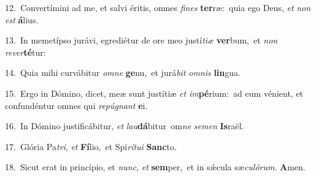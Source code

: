 {\numbfont\textcolor{\numbcolor}{12.}}~Convertímini ad me, et salvi éritis, omnes \textit{fi}\-\textit{nes} \textbf{ter}\-ræ:~\star quia ego Deus, \textit{et} \textit{non} \textit{est} \textbf{á}\-lius.\par
{\numbfont\textcolor{\numbcolor}{13.}}~In memetípso jurávi, egrediétur de ore meo justí\-\textit{ti}\-\textit{æ} \textbf{ver}\-bum,~\star et \textit{non} \textit{re}\-\textit{ver}\textbf{té}tur:\par
{\numbfont\textcolor{\numbcolor}{14.}}~Quia mihi curvábitur \textit{om}\-\textit{ne} \textbf{ge}\-nu,~\star et jurá\textit{bit} \textit{om}\-\textit{nis} \textbf{lin}\-gua.\par
{\numbfont\textcolor{\numbcolor}{15.}}~Ergo in Dómino, dicet, meæ sunt justítiæ \textit{et} \textit{im}\-\textbf{pé}rium:~\star ad eum vénient, et confundéntur omnes qui \textit{re}\-\textit{pú}\textit{gnant} \textbf{e}\-i.\par
{\numbfont\textcolor{\numbcolor}{16.}}~In Dómino justificábitur, \textit{et} \textit{lau}\-\textbf{dá}bitur~\star om\textit{ne} \textit{se}\-\textit{men} \textbf{Is}\-raël.\par
{\numbfont\textcolor{\numbcolor}{17.}}~Glória Pa\-\textit{tri}\-, \textit{et} \textbf{Fí}\-lio,~\star et Spi\-\textit{rí}\-\textit{tu}\textit{i} \textbf{Sanc}\-to.\par
{\numbfont\textcolor{\numbcolor}{18.}}~Sicut erat in princípio, et \textit{nunc}\-, \textit{et} \textbf{sem}\-per,~\star et in sǽcula sæ\-\textit{cu}\-\textit{ló}\textit{rum}. \textbf{A}\-men.\par
